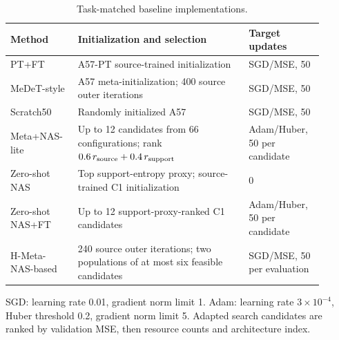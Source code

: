 \begin{table}[pos=H]
\centering\footnotesize
\caption{Task-matched baseline implementations.}\label{tab:baselines}
\begin{tabular}{p{0.19\linewidth}p{0.50\linewidth}p{0.21\linewidth}}
\toprule
Method & Initialization and selection & Target updates\\\midrule
PT+FT & A57-PT source-trained initialization & SGD/MSE, 50\\
MeDeT-style & A57 meta-initialization; 400 source outer iterations & SGD/MSE, 50\\
Scratch50 & Randomly initialized A57 & SGD/MSE, 50\\
Meta+NAS-lite & Up to 12 candidates from 66 configurations; rank $0.6\,r_{\rm source}+0.4\,r_{\rm support}$ & Adam/Huber, 50 per candidate\\
Zero-shot NAS & Top support-entropy proxy; source-trained C1 initialization & 0\\
Zero-shot NAS+FT & Up to 12 support-proxy-ranked C1 candidates & Adam/Huber, 50 per candidate\\
H-Meta-NAS-based & 240 source outer iterations; two populations of at most six feasible candidates & SGD/MSE, 50 per evaluation\\
\bottomrule
\end{tabular}
\par\vspace{3pt}\begin{minipage}{\linewidth}\footnotesize SGD: learning rate 0.01, gradient norm limit 1. Adam: learning rate $3\times10^{-4}$, Huber threshold 0.2, gradient norm limit 5. Adapted search candidates are ranked by validation MSE, then resource counts and architecture index.\end{minipage}
\end{table}
